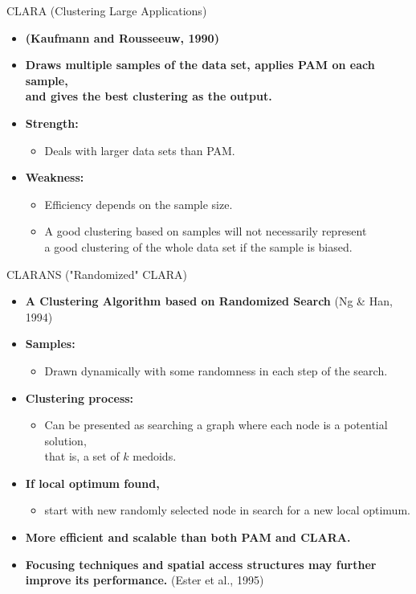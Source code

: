 \begin{frame}{CLARA (Clustering Large Applications)}
	\begin{itemize}
		\item \textbf{(Kaufmann and Rousseeuw, 1990)}
		\item \textbf{Draws multiple samples of the data set, applies PAM on
			      each sample,\\
			      and gives the best clustering as the output.}
		\item \textbf{Strength:}
		      \begin{itemize}
			      \item Deals with larger data sets than PAM.
		      \end{itemize}
		\item \textbf{Weakness:}
		      \begin{itemize}
			      \item Efficiency depends on the sample size.
			      \item A good clustering based on samples will not necessarily
			            represent \\
			            a good clustering of the whole data set if the sample is biased.
		      \end{itemize}
	\end{itemize}
\end{frame}

\begin{frame}{CLARANS ("Randomized" CLARA)}
	\begin{itemize}
		\item \textbf{A Clustering Algorithm based on Randomized Search} (Ng \&
		      Han, 1994)
		\item \textbf{Samples:}
		      \begin{itemize}
			      \item Drawn dynamically with some randomness in each step of the
			            search.
		      \end{itemize}
		\item \textbf{Clustering process:}
		      \begin{itemize}
			      \item Can be presented as searching a graph where each node is a
			            potential solution,\\
			            that is, a set of $k$ medoids.
		      \end{itemize}
		\item \textbf{If local optimum found,}
		      \begin{itemize}
			      \item start with new randomly selected node in search for a new
			            local optimum.
		      \end{itemize}
		\item \textbf{More efficient and scalable than both PAM and CLARA.}
		\item \textbf{Focusing techniques and spatial access structures may
			      further improve its performance.} (Ester et al., 1995)
	\end{itemize}
\end{frame}
